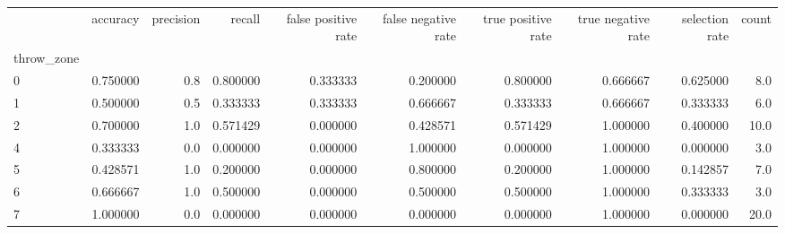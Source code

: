 \begin{tabular}{lrrrrrrrrr}
\toprule
{} &  accuracy &  precision &    recall &  false positive rate &  false negative rate &  true positive rate &  true negative rate &  selection rate &  count \\
throw\_zone &           &            &           &                      &                      &                     &                     &                 &        \\
\midrule
0          &  0.750000 &        0.8 &  0.800000 &             0.333333 &             0.200000 &            0.800000 &            0.666667 &        0.625000 &    8.0 \\
1          &  0.500000 &        0.5 &  0.333333 &             0.333333 &             0.666667 &            0.333333 &            0.666667 &        0.333333 &    6.0 \\
2          &  0.700000 &        1.0 &  0.571429 &             0.000000 &             0.428571 &            0.571429 &            1.000000 &        0.400000 &   10.0 \\
4          &  0.333333 &        0.0 &  0.000000 &             0.000000 &             1.000000 &            0.000000 &            1.000000 &        0.000000 &    3.0 \\
5          &  0.428571 &        1.0 &  0.200000 &             0.000000 &             0.800000 &            0.200000 &            1.000000 &        0.142857 &    7.0 \\
6          &  0.666667 &        1.0 &  0.500000 &             0.000000 &             0.500000 &            0.500000 &            1.000000 &        0.333333 &    3.0 \\
7          &  1.000000 &        0.0 &  0.000000 &             0.000000 &             0.000000 &            0.000000 &            1.000000 &        0.000000 &   20.0 \\
\bottomrule
\end{tabular}
